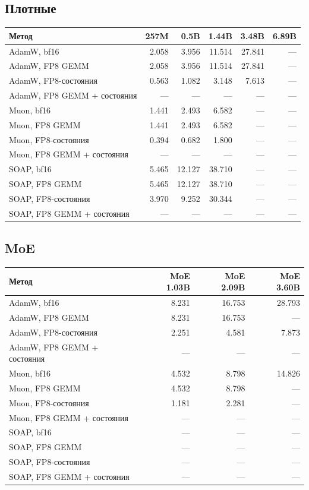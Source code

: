 \documentclass[10pt]{article}
\begin{document}
\subsection{Плотные}
\begin{center}
\small
\begin{tabular}{lrrrrr}
\toprule
\textbf{Метод} & \textbf{257M} & \textbf{0.5B} & \textbf{1.44B} & \textbf{3.48B} & \textbf{6.89B} \\
\midrule
AdamW, bf16 & 2.058 & 3.956 & 11.514 & 27.841 & --- \\
AdamW, FP8 GEMM & 2.058 & 3.956 & 11.514 & 27.841 & --- \\
AdamW, FP8-состояния & 0.563 & 1.082 & 3.148 & 7.613 & --- \\
AdamW, FP8 GEMM + состояния & --- & --- & --- & --- & --- \\
Muon, bf16 & 1.441 & 2.493 & 6.582 & --- & --- \\
Muon, FP8 GEMM & 1.441 & 2.493 & 6.582 & --- & --- \\
Muon, FP8-состояния & 0.394 & 0.682 & 1.800 & --- & --- \\
Muon, FP8 GEMM + состояния & --- & --- & --- & --- & --- \\
SOAP, bf16 & 5.465 & 12.127 & 38.710 & --- & --- \\
SOAP, FP8 GEMM & 5.465 & 12.127 & 38.710 & --- & --- \\
SOAP, FP8-состояния & 3.970 & 9.252 & 30.344 & --- & --- \\
SOAP, FP8 GEMM + состояния & --- & --- & --- & --- & --- \\
\bottomrule
\end{tabular}
\end{center}
\subsection{MoE}
\begin{center}
\small
\begin{tabular}{lrrr}
\toprule
\textbf{Метод} & \textbf{MoE 1.03B} & \textbf{MoE 2.09B} & \textbf{MoE 3.60B} \\
\midrule
AdamW, bf16 & 8.231 & 16.753 & 28.793 \\
AdamW, FP8 GEMM & 8.231 & 16.753 & --- \\
AdamW, FP8-состояния & 2.251 & 4.581 & 7.873 \\
AdamW, FP8 GEMM + состояния & --- & --- & --- \\
Muon, bf16 & 4.532 & 8.798 & 14.826 \\
Muon, FP8 GEMM & 4.532 & 8.798 & --- \\
Muon, FP8-состояния & 1.181 & 2.281 & --- \\
Muon, FP8 GEMM + состояния & --- & --- & --- \\
SOAP, bf16 & --- & --- & --- \\
SOAP, FP8 GEMM & --- & --- & --- \\
SOAP, FP8-состояния & --- & --- & --- \\
SOAP, FP8 GEMM + состояния & --- & --- & --- \\
\bottomrule
\end{tabular}
\end{center}
\end{document}
